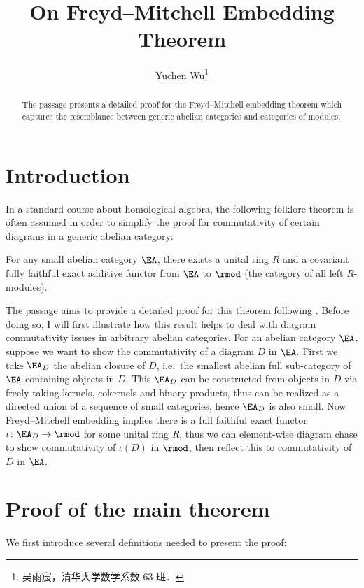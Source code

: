 \documentclass[twoside]{article}
\begin{document}
\title{On Freyd--Mitchell Embedding Theorem}
\author{Yuchen Wu\footnote{吴雨宸，清华大学数学系数 63 班．}}

\begin{abstract}
The passage presents a detailed proof for the Freyd--Mitchell embedding theorem which captures the resemblance between generic abelian categories and categories of modules.
\end{abstract}


\section{Introduction}

In a standard course about homological algebra, the following folklore theorem is often assumed in order to simplify the proof for commutativity of certain diagrams in a generic abelian category:
\begin{thm} \label{FE} For any small abelian category $\EA$, there exists a unital ring $R$ and a covariant fully faithful exact additive functor from $\EA$ to $\rmod$ (the category of all left $R$-modules).
\end{thm}

The passage aims to provide a detailed proof for this theorem following \cite{Fre64}. Before doing so, I will first illustrate how this result helps to deal with diagram commutativity issues in arbitrary abelian categories. For an abelian category $\EA$, suppose we want to show the commutativity of a diagram $D$ in $\EA$. First we take $\EA_D$ the abelian closure of $D$, i.e.\ the smallest abelian full sub-category of $\EA$ containing objects in $D$. This $\EA_D$ can be constructed from objects in $D$ via freely taking kernels, cokernels and binary products, thus can be realized as a directed union of a sequence of small categories, hence $\EA_D$ is also small. Now Freyd--Mitchell embedding implies there is a full faithful exact functor $\iota\colon \EA_D \rightarrow \rmod$ for some unital ring $R$, thus we can element-wise diagram chase to show commutativity of $\iota(D)$ in $\rmod$, then reflect this to commutativity of $D$ in $\EA$.

\section{Proof of the main theorem}

We first introduce several definitions needed to present the proof:
\end{document}
